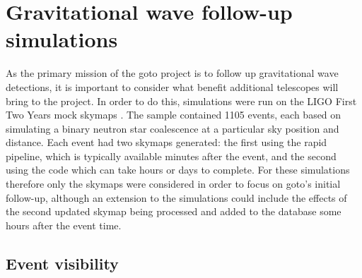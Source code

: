 
\newpage
\section{Gravitational wave follow-up simulations}
\label{sec:gw_sims}
\begin{colsection}


\begin{colsection}

As the primary mission of the \gls{goto} project is to follow up gravitational wave detections, it is important to consider what benefit additional telescopes will bring to the project. In order to do this, simulations were run on the LIGO First Two Years mock skymaps \citep{First2Years}. The sample contained 1105 events, each based on simulating a binary neutron star coalescence at a particular sky position and distance. Each event had two skymaps generated: the first using the rapid  pipeline, which is typically available minutes after the event, and the second using the  code which can take hours or days to complete. For these simulations therefore only the  skymaps were considered in order to focus on \gls{goto}'s initial follow-up, although an extension to the simulations could include the effects of the second updated skymap being processed and added to the database some hours after the event time.

\end{colsection}


\subsection{Event visibility}
\label{sec:gw_visability}
\begin{colsection}


\end{colsection}
\end{colsection}
